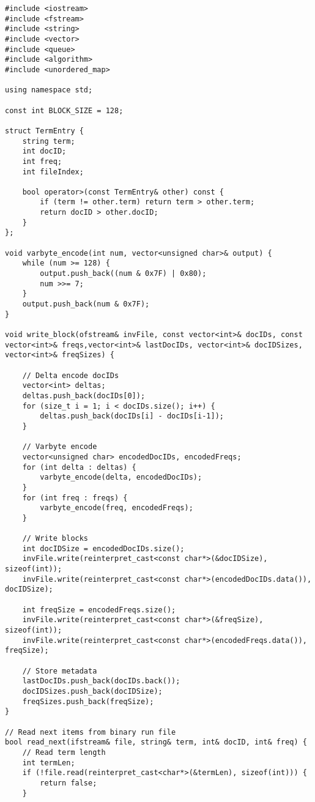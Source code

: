 \documentclass{article}
\begin{document}
\begin{lstlisting}[caption={The complete source code for the merger component.}, label={lst:merger}]
#include <iostream>
#include <fstream>
#include <string>
#include <vector>
#include <queue>
#include <algorithm>
#include <unordered_map>

using namespace std;

const int BLOCK_SIZE = 128;

struct TermEntry {
    string term;
    int docID;
    int freq;
    int fileIndex;
    
    bool operator>(const TermEntry& other) const {
        if (term != other.term) return term > other.term;
        return docID > other.docID;
    }
};

void varbyte_encode(int num, vector<unsigned char>& output) {
    while (num >= 128) {
        output.push_back((num & 0x7F) | 0x80);
        num >>= 7;
    }
    output.push_back(num & 0x7F);
}

void write_block(ofstream& invFile, const vector<int>& docIDs, const vector<int>& freqs,vector<int>& lastDocIDs, vector<int>& docIDSizes, vector<int>& freqSizes) {
    
    // Delta encode docIDs
    vector<int> deltas;
    deltas.push_back(docIDs[0]);
    for (size_t i = 1; i < docIDs.size(); i++) {
        deltas.push_back(docIDs[i] - docIDs[i-1]);
    }
    
    // Varbyte encode
    vector<unsigned char> encodedDocIDs, encodedFreqs;
    for (int delta : deltas) {
        varbyte_encode(delta, encodedDocIDs);
    }
    for (int freq : freqs) {
        varbyte_encode(freq, encodedFreqs);
    }
    
    // Write blocks
    int docIDSize = encodedDocIDs.size();
    invFile.write(reinterpret_cast<const char*>(&docIDSize), sizeof(int));
    invFile.write(reinterpret_cast<const char*>(encodedDocIDs.data()), docIDSize);
    
    int freqSize = encodedFreqs.size();
    invFile.write(reinterpret_cast<const char*>(&freqSize), sizeof(int));
    invFile.write(reinterpret_cast<const char*>(encodedFreqs.data()), freqSize);
    
    // Store metadata
    lastDocIDs.push_back(docIDs.back());
    docIDSizes.push_back(docIDSize);
    freqSizes.push_back(freqSize);
}

// Read next items from binary run file
bool read_next(ifstream& file, string& term, int& docID, int& freq) {
    // Read term length
    int termLen;
    if (!file.read(reinterpret_cast<char*>(&termLen), sizeof(int))) {
        return false;
    }
    

\end{lstlisting}
\end{document}
